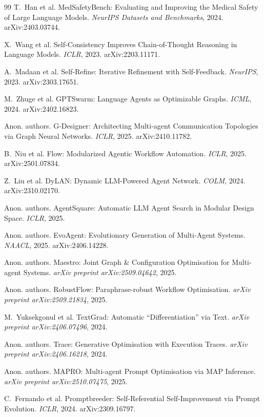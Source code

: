 \documentclass[11pt,a4paper]{ctexart}
\begin{document}
\begin{thebibliography}{99}
T.~Han et al.
MedSafetyBench: Evaluating and Improving the Medical Safety of Large Language Models.
\emph{NeurIPS Datasets and Benchmarks}, 2024. arXiv:2403.03744.

X.~Wang et al.
Self-Consistency Improves Chain-of-Thought Reasoning in Language Models.
\emph{ICLR}, 2023. arXiv:2203.11171.

A.~Madaan et al.
Self-Refine: Iterative Refinement with Self-Feedback.
\emph{NeurIPS}, 2023. arXiv:2303.17651.

M.~Zhuge et al.
GPTSwarm: Language Agents as Optimizable Graphs.
\emph{ICML}, 2024. arXiv:2402.16823.

Anon. authors.
G-Designer: Architecting Multi-agent Communication Topologies via Graph Neural Networks.
\emph{ICLR}, 2025. arXiv:2410.11782.

B.~Niu et al.
Flow: Modularized Agentic Workflow Automation.
\emph{ICLR}, 2025. arXiv:2501.07834.

Z.~Liu et al.
DyLAN: Dynamic LLM-Powered Agent Network.
\emph{COLM}, 2024. arXiv:2310.02170.

Anon. authors.
AgentSquare: Automatic LLM Agent Search in Modular Design Space.
\emph{ICLR}, 2025.

Anon. authors.
EvoAgent: Evolutionary Generation of Multi-Agent Systems.
\emph{NAACL}, 2025. arXiv:2406.14228.

Anon. authors.
Maestro: Joint Graph \& Configuration Optimisation for Multi-agent Systems.
\emph{arXiv preprint arXiv:2509.04642}, 2025.

Anon. authors.
RobustFlow: Paraphrase-robust Workflow Optimisation.
\emph{arXiv preprint arXiv:2509.21834}, 2025.

M.~Yuksekgonul et al.
TextGrad: Automatic ``Differentiation'' via Text.
\emph{arXiv preprint arXiv:2406.07496}, 2024.

Anon. authors.
Trace: Generative Optimisation with Execution Traces.
\emph{arXiv preprint arXiv:2406.16218}, 2024.

Anon. authors.
MAPRO: Multi-agent Prompt Optimisation via MAP Inference.
\emph{arXiv preprint arXiv:2510.07475}, 2025.

C.~Fernando et al.
Promptbreeder: Self-Referential Self-Improvement via Prompt Evolution.
\emph{ICLR}, 2024. arXiv:2309.16797.

\end{thebibliography}
\end{document}

